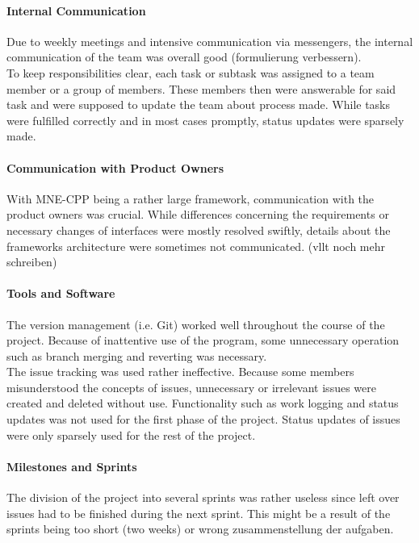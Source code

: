 \paragraph{Internal Communication}

Due to weekly meetings and intensive communication via messengers, the internal communication of the team was overall good (formulierung verbessern).\\
To keep responsibilities clear, each task or subtask was assigned to a team member or a group of members. These members then were answerable for said task and were supposed to update the team about process made. While tasks were fulfilled correctly and in most cases promptly, status updates were sparsely made.

\paragraph{Communication with Product Owners}

With MNE-CPP being a rather large framework, communication with the product owners was crucial. While differences concerning the requirements or necessary changes of interfaces were mostly resolved swiftly, details about the frameworks architecture were sometimes not communicated. (vllt noch mehr schreiben)

\paragraph{Tools and Software}

The version management (i.e. Git) worked well throughout the course of the project. Because of inattentive use of the program, some unnecessary operation such as branch merging and reverting was necessary.\\
The issue tracking was used rather ineffective. Because some members misunderstood the concepts of issues, unnecessary or irrelevant issues were created and deleted without use. Functionality such as work logging and status updates was not used for the first phase of the project. Status updates of issues were only sparsely used for the rest of the project.

\paragraph{Milestones and Sprints}

The division of the project into several sprints was rather useless since left over issues had to be finished during the next sprint. This might be a result of the sprints being too short (two weeks) or wrong zusammenstellung der aufgaben.

